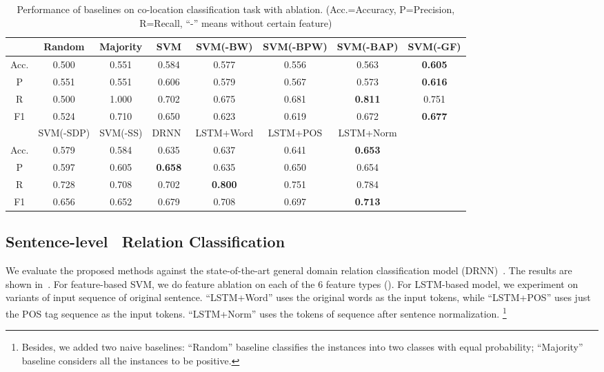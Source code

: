 \begin{table}[t]
	\centering
	\scriptsize
	\begin{tabular}{|c|c|c|c|c|c|c|c|}
		\hline
		& Random       & Majority    & SVM  & SVM(-BW)    & SVM(-BPW) & SVM(-BAP)   & SVM(-GF)    \\ \hline
		Acc.  & 0.500        & 0.551       & 0.584                                & 0.577          & 0.556        & 0.563          & \textbf{0.605} \\ \hline
		P & 0.551        & 0.551       & 0.606                                & 0.579          & 0.567        & 0.573          & \textbf{0.616} \\ \hline
		R    & 0.500        & 1.000       & 0.702                                & 0.675          & 0.681        & \textbf{0.811} & 0.751          \\ \hline
		F1        & 0.524        & 0.710       & 0.650                                & 0.623          & 0.619        & 0.672          & \textbf{0.677} \\ \hline \hline
		& SVM(-SDP) & SVM(-SS) & DRNN~\cite{xu2015classifying} & LSTM+Word    & LSTM+POS   & LSTM+Norm    &                \\ \hline
		Acc.  & 0.579        & 0.584       & 0.635                                & 0.637          & 0.641        & \textbf{0.653} &                \\ \hline
		P & 0.597        & 0.605       & \textbf{0.658}                       & 0.635          & 0.650        & 0.654          &                \\ \hline
		R    & 0.728        & 0.708       & 0.702                                & \textbf{0.800} & 0.751        & 0.784          &                \\ \hline
		F1        & 0.656        & 0.652       & 0.679                                & 0.708          & 0.697        & \textbf{0.713} &                \\ \hline
	\end{tabular}
	\caption{Performance of baselines on co-location classification task with ablation. (Acc.=Accuracy, P=Precision, R=Recall, ``-'' means without certain feature)}
	\label{tab:aprf}
\end{table}
\subsection{Sentence-level \lnear\ Relation Classification}
We evaluate the proposed methods against the state-of-the-art general domain relation 
classification model (DRNN)~\cite{Xu2016ImprovedRC}. 
The results are shown in~.
For feature-based SVM, we do feature ablation on each of the 6 feature types (). For LSTM-based model, we experiment on variants of input sequence of original sentence.
``LSTM+Word'' uses the original words as the input tokens, while ``LSTM+POS'' uses just the POS tag sequence as the input tokens. ``LSTM+Norm'' uses the tokens of sequence after sentence normalization. \footnote{Besides, we added two naive baselines: ``Random'' baseline
	classifies the instances into two classes with equal probability; 
	``Majority'' baseline considers all the instances to be positive.}


